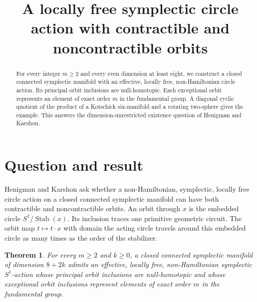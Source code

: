 \documentclass[11pt]{amsart}
\title[Mixed orbit contractibility]{A locally free symplectic circle action with contractible and noncontractible orbits}
\date{}
\newtheorem{theorem}{Theorem}
\begin{document}
\begin{abstract}
For every integer \(m\geq 2\) and every even dimension at least eight, we construct a closed connected symplectic manifold with an effective, locally free, non-Hamiltonian circle action. Its principal orbit inclusions are null-homotopic. Each exceptional orbit represents an element of exact order \(m\) in the fundamental group. A diagonal cyclic quotient of the product of a Kotschick six-manifold and a rotating two-sphere gives the example. This answers the dimension-unrestricted existence question of Henigman and Karshon.
\end{abstract}
\maketitle
\section{Question and result}
Henigman and Karshon \cite[Question 8.2]{HK} ask whether a non-Hamiltonian, symplectic, locally free circle action on a closed connected symplectic manifold can have both contractible and noncontractible orbits. An orbit through \(x\) is the embedded circle \(S^1/\operatorname{Stab}(x)\). Its inclusion traces one primitive geometric circuit. The orbit map \(t\mapsto t\cdot x\) with domain the acting circle travels around this embedded circle as many times as the order of the stabilizer.

\begin{theorem}
For every \(m\geq2\) and \(k\geq0\), a closed connected symplectic manifold of dimension \(8+2k\) admits an effective, locally free, non-Hamiltonian symplectic \(S^1\)-action whose principal orbit inclusions are null-homotopic and whose exceptional orbit inclusions represent elements of exact order \(m\) in the fundamental group.
\end{theorem}
\end{document}
